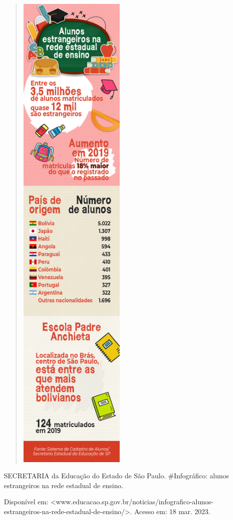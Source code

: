 \begin{itemize}
{{{\begin{itemize}
\begin{itemize}
\begin{itemize}
\begin{quote}
\includegraphics[width=2.04375in,height=9.72500in]{media/image33.png}
\end{quote}

SECRETARIA da Educação do Estado de São Paulo. \#Infográfico: alunos
estrangeiros na rede estadual de ensino.

Disponível em:
\textless{}www.educacao.sp.gov.br/noticias/infografico-alunos-estrangeiros-na-rede-estadual-de-ensino/\textgreater{}.
Acesso em: 18 mar. 2023.


\end{itemize}
\end{itemize}
\end{itemize}}}}
\end{itemize}
